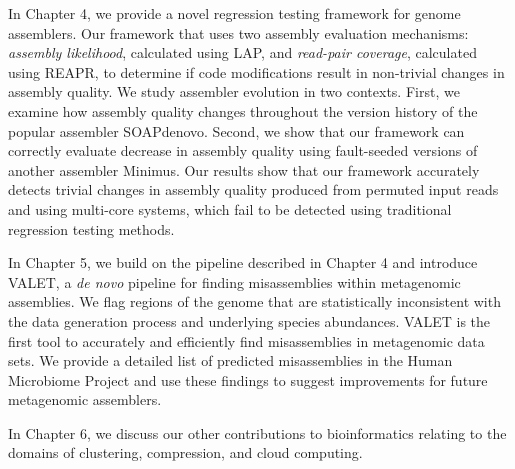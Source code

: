 In Chapter 4, we provide a novel regression testing framework for genome assemblers.
Our framework that uses two assembly evaluation mechanisms: \emph{assembly likelihood}, calculated using LAP\cite{LAP}, and \emph{read-pair coverage}, calculated using REAPR\cite{hunt2013reapr}, to determine if code modifications result in non-trivial
changes in assembly quality.
We study assembler evolution in two contexts. First,
we examine how assembly quality changes
throughout the version history of the popular assembler SOAPdenovo. Second,
we show that our framework can correctly evaluate decrease in assembly quality
using fault-seeded versions of another assembler Minimus.
Our results show that our framework accurately detects trivial
changes in assembly quality produced from permuted input reads and using
multi-core systems, which fail to be detected using traditional regression
testing methods.

In Chapter 5, we build on the pipeline described in Chapter 4 and introduce VALET, a \emph{de novo} pipeline for finding mis­assemblies within metagenomic assemblies.
We flag regions of the genome that are statistically inconsistent with the data generation process and underlying species abundances.
VALET is the first tool to accurately and efficiently find mis­assemblies in metagenomic data sets.
We provide a detailed list of predicted mis­assemblies in the Human Microbiome Project and use these findings to suggest improvements for future metagenomic assemblers.

In Chapter 6, we discuss our other contributions to bioinformatics relating to the domains of clustering, compression, and cloud computing.
